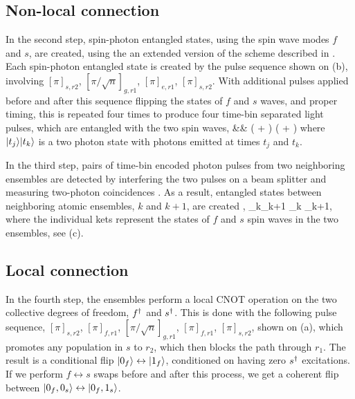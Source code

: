 \subsection{Non-local connection}
In the second step, spin-photon entangled states, using the spin wave modes $f$
and $s$, are created, using the an extended version of the scheme described in
\cite{Li2013}. Each spin-photon entangled state is created by the pulse sequence
shown on (b), involving $[\pi]_{s,r2}$,
$[\pi/\sqrt{n}]_{g,r1}$, $[\pi]_{e,r1}$, $[\pi]_{s,r2}$. With additional pulses
applied before and after this sequence flipping the states of $f$ and $s$ waves,
and proper timing, this is repeated four times to produce four time-bin
separated light pulses, which are entangled with the two spin waves,
\bal
	&& \Big(
	 + 
	\Big)
	\Big(
	 + 
	\Big)
\label{eq:step2}
\eal
where $| t_j \rangle| t_k \rangle$ is a two photon state with photons emitted at times
$t_j$ and $t_k$.


In the third step, pairs of time-bin encoded photon pulses from two neighboring
ensembles are detected by interfering the two pulses on a beam splitter and
measuring two-photon coincidences \cite{duan3, Honjo2007, Rubenok2013}.
As a result, entangled states between neighboring atomic ensembles, $k$ and
$k+1$, are created \cite{Lukin2003, Shwa2013},
\bel
	_k_{k+1} \pm {}_k _{k+1},
\eel
where the individual kets represent the states of $f$ and $s$ spin waves in the
two ensembles, see (c).



\subsection{Local connection}
In the fourth step, the ensembles perform a local CNOT operation on the two
collective degrees of freedom, $f^\dagger$ and $s^\dagger$. This is done with the
following pulse sequence, $[\pi]_{s,r2}$, $[\pi]_{f,r1}$,
$[\pi/\sqrt{n}]_{g,r1}$, $[\pi]_{f,r1}$, $[\pi]_{s,r2}$, shown on
(a), which promotes any population in $s$ to $r_2$, which
then blocks the path through $r_1$. The result is a
conditional flip $| 0_f \rangle \leftrightarrow | 1_f \rangle$, conditioned on having zero $s^\dagger$ excitations. If we perform
$f\leftrightarrow s$ swaps before and after this process, we get a coherent flip
between $| 0_f, 0_s \rangle \leftrightarrow | 0_f, 1_s \rangle$. 

